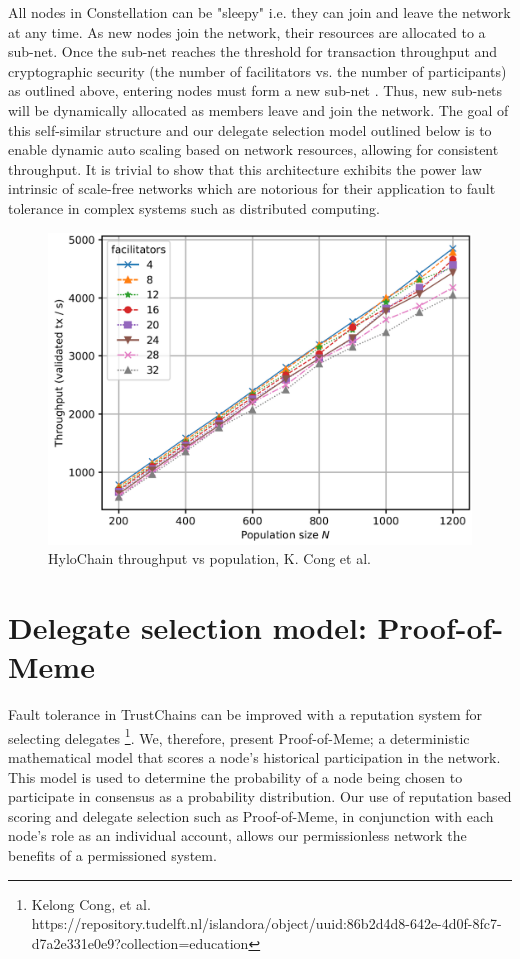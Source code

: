 \documentclass{article}
\begin{document}
All nodes in Constellation can be  "sleepy" i.e. they can join and leave the network at any time. As new nodes join the network, their resources are allocated to a sub-net. Once the sub-net reaches the threshold for transaction throughput and cryptographic security (the number of facilitators vs. the number of participants) as outlined above, entering nodes must form a new sub-net . Thus, new sub-nets will be dynamically allocated as members leave and join the network. The goal of this self-similar structure and our delegate selection model outlined below is to enable dynamic auto scaling based on network resources, allowing for consistent throughput. It is trivial to show that this architecture exhibits the power law intrinsic of scale-free networks which are notorious for their application to fault tolerance in complex systems such as distributed computing. 

\begin{figure}[H]
\centering
\includegraphics[scale=0.45]{hylochain-throughput-graph}
\caption{HyloChain throughput vs population, K. Cong et al.}
\end{figure} 

\section{Delegate selection model: Proof-of-Meme}
Fault tolerance in TrustChains can be improved with a reputation system for selecting delegates \footnote{Kelong Cong, et al. https://repository.tudelft.nl/islandora/object/uuid:86b2d4d8-642e-4d0f-8fc7-d7a2e331e0e9?collection=education}. We, therefore, present Proof-of-Meme; a deterministic mathematical model that scores a node's historical participation in the network. This model is used to determine the probability of a node being chosen to participate in consensus as a probability distribution. Our use of reputation based scoring and delegate selection such as Proof-of-Meme, in conjunction with each node's role as an individual account, allows our permissionless network the benefits of a permissioned system.
\end{document}
